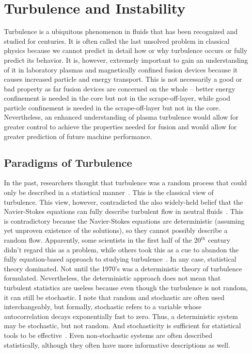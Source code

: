 \chapter{Turbulence and Instability}
\label{c_turb_and_inst}

Turbulence is a ubiquitous phenomenon in fluids that has been recognized and studied for centuries. It is often called the last unsolved problem in classical physics because we cannot predict in detail how or why
turbulence occurs or fully predict its behavior. It is, however, extremely important to gain an understanding of it in laboratory plasmas and magnetically confined
fusion devices because it causes increased particle and energy
transport. This is not necessarily a good or bad property as far fusion devices are concerned on the whole -- better energy confinement is needed in the core but not in the scrape-off-layer,
while good particle confinement is needed in the scrape-off-layer but not in the core. Nevertheless, an enhanced understanding of plasma turbulence would allow for greater control to achieve
the properties needed for fusion and would allow for greater prediction of future machine performance.

\section{Paradigms of Turbulence}
\label{s_turb_paradigms}

In the past, researchers thought that turbulence was a random process that could only be described in a statistical manner~\cite{tennekes1972}. This is the classical view of turbulence.
This view, however, contradicted the also widely-held belief that the Navier-Stokes equations can fully describe turbulent flow in neutral fluids~\cite{mcdonough04}. 
This is contradictory because the Navier-Stokes equations are deterministic (assuming yet unproven existence of the solutions), so they cannot possibly describe a random flow.
Apparently, some scientists in the first half of the 20$^{th}$ century didn't regard this as a problem, while others took this as a cue to abandon the fully equation-based approach 
to studying turbulence~\cite{tennekes1972}. In any case, statistical theory dominated. 
Not until the 1970's was a deterministic theory of turbulence formulated. Nevertheless, the deterministic approach does
not mean that turbulent statistics are useless because even though the turbulence is not random, it can still be stochastic. I note that random and stochastic are often used interchangeably,
but formally, stochastic refers to a variable whose autocorrelation decays exponentially fast to zero. Thus, a deterministic system may be stochastic, but not random. And stochasticity
is sufficient for statistical tools to be effective~\cite{mcdonough04}. Even non-stochastic systems are often described statistically, although they often have more informative descriptions as well.

